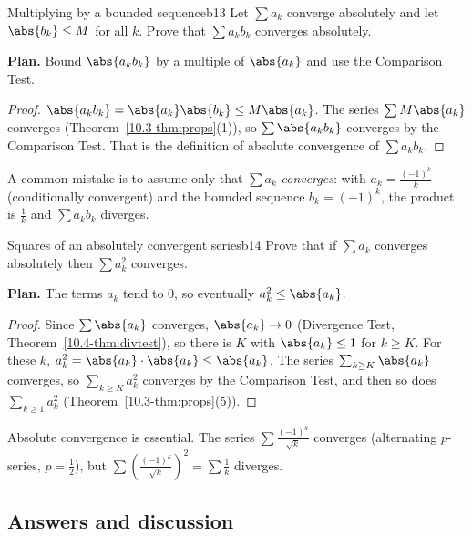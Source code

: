 \documentclass[11pt]{article}
\begin{document}
\begin{exmp}{Multiplying by a bounded sequence}{b13}
Let $\sum a_k$ converge absolutely and let $\abs{b_k}\le M$ for all $k$. Prove that $\sum a_kb_k$ converges absolutely.

\textbf{Plan.} Bound $\abs{a_kb_k}$ by a multiple of $\abs{a_k}$ and use the Comparison Test.

\begin{proof}
$\abs{a_kb_k}=\abs{a_k}\abs{b_k}\le M\abs{a_k}$. The series $\sum M\abs{a_k}$ converges (Theorem~\ref{10.3-thm:props}(1)), so $\sum\abs{a_kb_k}$ converges by the Comparison Test. That is the definition of absolute convergence of $\sum a_kb_k$.
\end{proof}
A common mistake is to assume only that $\sum a_k$ \emph{converges}: with $a_k=\frac{(-1)^k}k$ (conditionally convergent) and the bounded sequence $b_k=(-1)^k$, the product is $\frac1k$ and $\sum a_kb_k$ diverges.
\end{exmp}

\begin{exmp}{Squares of an absolutely convergent series}{b14}
Prove that if $\sum a_k$ converges absolutely then $\sum a_k^2$ converges.

\textbf{Plan.} The terms $a_k$ tend to $0$, so eventually $a_k^2\le\abs{a_k}$.

\begin{proof}
Since $\sum\abs{a_k}$ converges, $\abs{a_k}\to0$ (Divergence Test, Theorem~\ref{10.4-thm:divtest}), so there is $K$ with $\abs{a_k}\le1$ for $k\ge K$. For these $k$, $a_k^2=\abs{a_k}\cdot\abs{a_k}\le\abs{a_k}$. The series $\sum_{k\ge K}\abs{a_k}$ converges, so $\sum_{k\ge K}a_k^2$ converges by the Comparison Test, and then so does $\sum_{k\ge1}a_k^2$ (Theorem~\ref{10.3-thm:props}(5)).
\end{proof}
Absolute convergence is essential. The series $\sum\frac{(-1)^k}{\sqrt k}$ converges (alternating $p$-series, $p=\frac12$), but $\sum\left(\frac{(-1)^k}{\sqrt k}\right)^2=\sum\frac1k$ diverges.
\end{exmp}

\subsection*{Answers and discussion}
\end{document}
